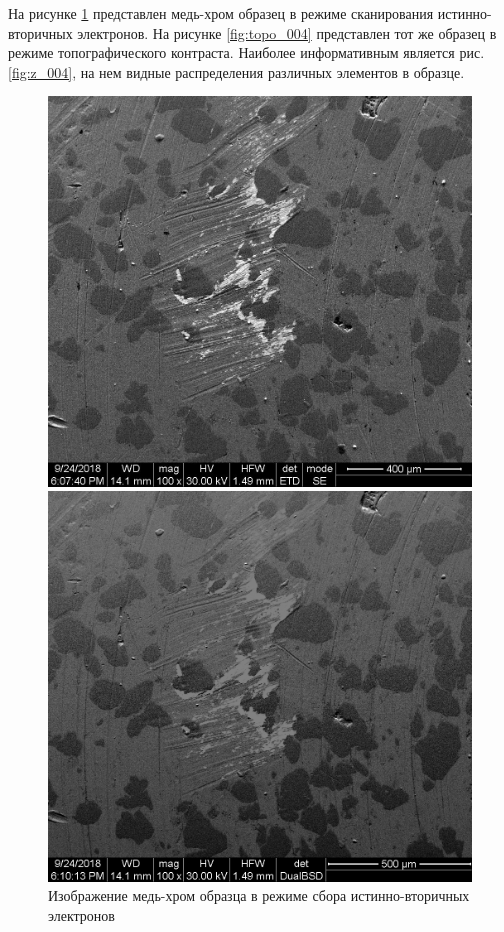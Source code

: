 \documentclass[a4paper, 12pt]{article}
\begin{document}
	На рисунке \ref{fig:iv_005} представлен медь-хром образец в режиме сканирования истинно-вторичных электронов. На рисунке \ref{fig:topo_004} представлен тот же образец в режиме топографического контраста. Наиболее информативным является рис. \ref{fig:z_004}, на нем видные распределения различных элементов в образце.\par
	\begin{figure}[!htb]
		\includegraphics[width=\linewidth]{iv_005.jpg}
		\caption{Изображение медь-хром образца в режиме сбора истинно-вторичных электронов}
		\label{fig:iv_005}
		\endminipage\hfill
		\includegraphics[width=\linewidth]{topo_004.tif}

\end{figure}
\end{document}
